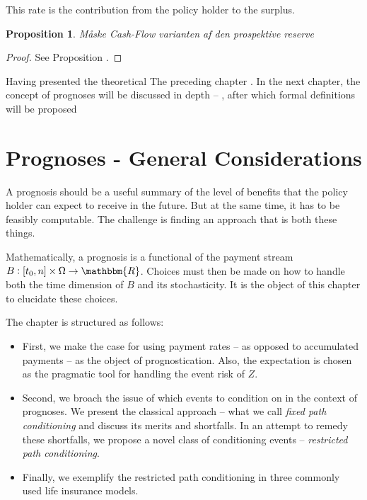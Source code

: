 \documentclass{book}
\newcommand{\1}[1]{\mathbbm{1}_{\left\lbrace #1 \right\rbrace}}
\theoremstyle{break}
\newtheorem{proposition}[definition]{Proposition}%
\theoremstyle{remark}
\numberwithin{equation}{section}
\begin{document}
This rate is the contribution from the policy holder to the surplus.

\begin{proposition}
	Måske Cash-Flow varianten af den prospektive reserve
\end{proposition}

\begin{proof}
	See Proposition \cite{BuchardtMoller}.
\end{proof}

Having presented the theoretical The preceding chapter . In the next chapter, the concept of prognoses will be discussed in depth -- , after which formal definitions will be proposed

\newpage

\chapter{Prognoses - General Considerations}

A prognosis should be a useful summary of the level of benefits that the policy holder can expect to receive in the future. But at the same time, it has to be  feasibly computable. The challenge is finding an approach that is both these things.

Mathematically, a prognosis is a functional of the payment stream $B: [t_0,n] \times \Omega \to \mathbbm{R}$. Choices must then be made on how to handle both the time dimension of $B$ and its stochasticity. It is the object of this chapter to elucidate these choices.

The chapter is structured as follows:

\begin{itemize}
	\item First, we make the case for using payment rates -- as opposed to accumulated payments -- as the object of prognostication. Also, the expectation is chosen as the pragmatic tool for handling the event risk of $Z$.
	\item Second, we broach the issue of which events to condition on in the context of prognoses. We present the classical approach -- what we call \textit{fixed path conditioning} and discuss its merits and shortfalls. In an attempt to remedy these shortfalls, we propose a novel class of conditioning events -- \textit{restricted path conditioning}.
	\item Finally, we exemplify the restricted path conditioning in three commonly used life insurance models.
\end{itemize}
\end{document}
